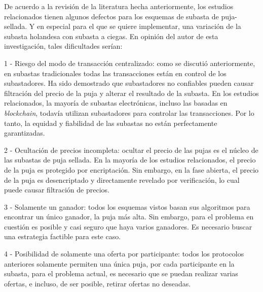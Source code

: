 

    De acuerdo a la revisión de la literatura hecha anteriormente, los estudios relacionados tienen algunos defectos para los 
    esquemas de subasta de puja-sellada. Y en especial para el que se quiere implementar, una variación de la subasta holandesa con 
    subasta a ciegas. En opinión del autor de esta investigación, tales dificultades serían:

    1 - Riesgo del modo de transacción centralizado: como se discutió anteriormente, en subastas 
    tradicionales todas las transacciones
    están en control de los subastadores. Ha sido demostrado que subastadores no confiables pueden causar filtración del precio de la puja
    y alterar el resultado de la subasta. En los estudios relacionados, la mayoría de subastas electrónicas, incluso las basadas en 
    \textit{blockchain}, todavía utilizan subastadores para controlar las transacciones. Por lo tanto, la equidad y fiabilidad de las 
    subastas no están perfectamente garantizadas.

    2 - Ocultación de precios incompleta: ocultar el precio de las pujas es el núcleo de las subastas de puja sellada. En la mayoría de los estudios 
    relacionados, el precio de la puja es protegido por encriptación. Sin embargo, en la fase abierta, el precio de la puja es desencriptado
    y directamente revelado por verificación, lo cual puede causar filtración de precios.

    3 - Solamente un ganador: todos los esquemas vistos basan sus algoritmos para encontrar un único ganador, la puja más alta. Sin embargo, para
    el problema en cuestión es posible y casi seguro que haya varios ganadores. Es necesario buscar una estrategia factible para este caso.
    
    4 - Posibilidad de solamente una oferta por participante: todos los protocolos anteriores solamente permiten una única puja, por cada participante
    en la subasta, para el problema actual, es necesario que se puedan realizar varias ofertas, e incluso,
    de ser posible, retirar ofertas no deseadas.

